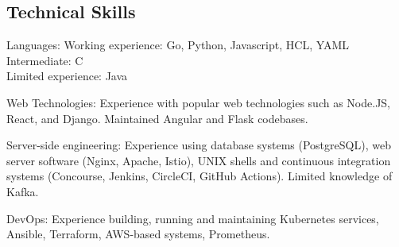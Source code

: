 \documentclass[11pt,a4paper]{article}
\newenvironment{indentsection}[1]%
{\begin{list}{}%
	{\setlength{\leftmargin}{#1}}%
	\item[]%
}
{\end{list}}
\begin{document}
\subsection*{Technical Skills}

\begin{indentsection}{\parindent}
\begin{description*}
	\item[Languages:]
    Working experience: Go, Python, Javascript, HCL, YAML\\
    Intermediate: C\\
    Limited experience: Java
	\item[Web Technologies:]
	    Experience with popular web technologies such as Node.JS, React, and Django. Maintained Angular and Flask codebases.
	\item[Server-side engineering:]
	Experience using database systems (PostgreSQL), web server software (Nginx, Apache, Istio), UNIX shells and continuous integration systems (Concourse, Jenkins, CircleCI, GitHub Actions). Limited knowledge of Kafka.
        \item[DevOps:] Experience building, running and maintaining Kubernetes services, Ansible, Terraform, AWS-based systems, Prometheus.
\end{description*}
\end{indentsection}

\end{document}
